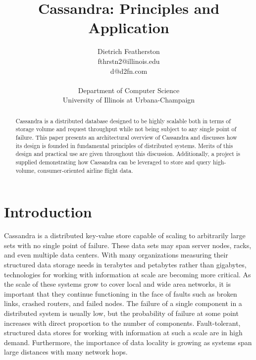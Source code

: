 \documentclass[twocolumn]{article}
\begin{document}
\title{Cassandra: Principles and Application}
\author{Dietrich Featherston\\
\small fthrstn2@illinois.edu\\
\small d@d2fn.com\\
\small \\
\small Department of Computer Science\\
\small University of Illinois at Urbana-Champaign
\small \\[-0.25in]} \date{}
\maketitle

\pagestyle{myheadings}
\thispagestyle{empty}

\begin{abstract}
\noindent
Cassandra is a distributed database designed to be highly scalable both in terms of storage volume and request throughput while not being subject to any single point of failure. This paper presents an architectural overview of Cassandra and discusses how its design is founded in fundamental principles of distributed systems.  Merits of this design and practical use are given throughout this discussion.   Additionally, a project is supplied demonstrating how Cassandra can be leveraged to store and query high-volume, consumer-oriented airline flight data.
\end{abstract}

\section{Introduction}\label{s:intro}

Cassandra is a distributed key-value store capable of scaling to arbitrarily large sets with no single point of failure.   These data sets may span server nodes, racks, and even multiple data centers.  With many organizations measuring their structured data storage needs in terabytes and petabytes rather than gigabytes, technologies for working with information at scale are becoming more critical. As the scale of these systems grow to cover local and wide area networks, it is important that they continue functioning in the face of faults such as broken links, crashed routers, and failed nodes.  The failure of a single component in a distributed system is usually low, but the probability of failure at some point increases with direct proportion to the number of components.  Fault-tolerant, structured data stores for working with information at such a scale are in high demand.  Furthermore, the importance of data locality is growing as systems span large distances with many network hops.
\end{document}
